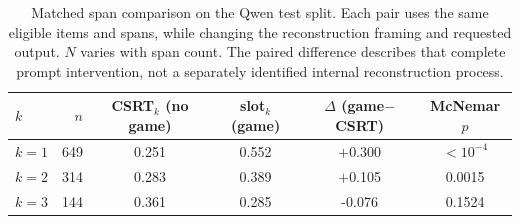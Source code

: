 \begin{table}[t]\centering
\caption{Matched span comparison on the Qwen test split. Each pair uses the same eligible items and spans, while changing the reconstruction framing and requested output. $N$ varies with span count. The paired difference describes that complete prompt intervention, not a separately identified internal reconstruction process.}
\label{tab:matched}
\begin{tabular}{l r cc cc}\toprule
$k$ & $n$ & CSRT$_k$ (no game) & slot$_k$ (game) & $\Delta$ (game$-$CSRT) & McNemar $p$ \\\midrule
$k{=}1$ & 649 & 0.251 & 0.552 & $+$0.300 & $<10^{-4}$ \\
$k{=}2$ & 314 & 0.283 & 0.389 & $+$0.105 & 0.0015 \\
$k{=}3$ & 144 & 0.361 & 0.285 & -0.076 & 0.1524 \\
\bottomrule\end{tabular}\end{table}
